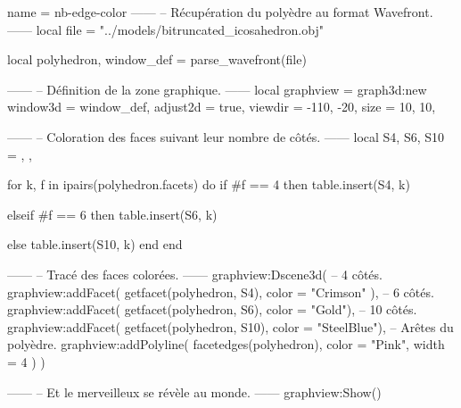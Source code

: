 \documentclass{standalone}
\begin{document}
\begin{luadraw}{name = nb-edge-color}
------
-- Récupération du polyèdre au format Wavefront.
------
local file = "../models/bitruncated_icosahedron.obj"

local polyhedron, window_def = parse_wavefront(file)

------
-- Définition de la zone graphique.
------
local graphview = graph3d:new{
  window3d = window_def,
  adjust2d = true,
  viewdir  = {-110, -20},
  size     = {10, 10},
}

------
-- Coloration des faces suivant leur nombre de côtés.
------
local S4, S6, S10 = {}, {}, {}

for k, f in ipairs(polyhedron.facets) do
  if #f == 4 then
    table.insert(S4, k)

  elseif #f == 6 then
    table.insert(S6, k)

  else
    table.insert(S10, k)
  end
end

------
-- Tracé des faces colorées.
------
graphview:Dscene3d(
-- 4 côtés.
  graphview:addFacet(
    getfacet(polyhedron, S4),
    {
      color = "Crimson"
    }),
-- 6 côtés.
  graphview:addFacet(
    getfacet(polyhedron, S6),
    {color = "Gold"}),
-- 10 côtés.
  graphview:addFacet(
    getfacet(polyhedron, S10),
    {color = "SteelBlue"}),
-- Arêtes du polyèdre.
  graphview:addPolyline(
    facetedges(polyhedron),
    {
      color = "Pink",
      width = 4
    })
)

------
-- Et le merveilleux se révèle au monde.
------
graphview:Show()
\end{luadraw}
\end{document}
